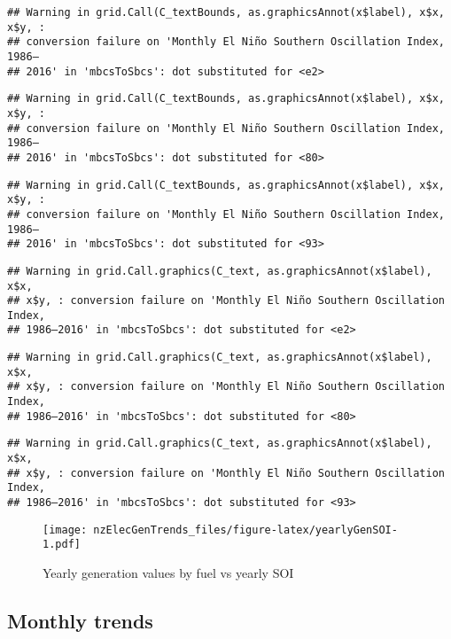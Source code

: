 \documentclass[]{article}
\theoremstyle{definition}
\theoremstyle{definition}
\theoremstyle{definition}
\theoremstyle{remark}
\begin{document}
\begin{verbatim}
## Warning in grid.Call(C_textBounds, as.graphicsAnnot(x$label), x$x, x$y, :
## conversion failure on 'Monthly El Niño Southern Oscillation Index, 1986–
## 2016' in 'mbcsToSbcs': dot substituted for <e2>
\end{verbatim}

\begin{verbatim}
## Warning in grid.Call(C_textBounds, as.graphicsAnnot(x$label), x$x, x$y, :
## conversion failure on 'Monthly El Niño Southern Oscillation Index, 1986–
## 2016' in 'mbcsToSbcs': dot substituted for <80>
\end{verbatim}

\begin{verbatim}
## Warning in grid.Call(C_textBounds, as.graphicsAnnot(x$label), x$x, x$y, :
## conversion failure on 'Monthly El Niño Southern Oscillation Index, 1986–
## 2016' in 'mbcsToSbcs': dot substituted for <93>
\end{verbatim}

\begin{verbatim}
## Warning in grid.Call.graphics(C_text, as.graphicsAnnot(x$label), x$x,
## x$y, : conversion failure on 'Monthly El Niño Southern Oscillation Index,
## 1986–2016' in 'mbcsToSbcs': dot substituted for <e2>
\end{verbatim}

\begin{verbatim}
## Warning in grid.Call.graphics(C_text, as.graphicsAnnot(x$label), x$x,
## x$y, : conversion failure on 'Monthly El Niño Southern Oscillation Index,
## 1986–2016' in 'mbcsToSbcs': dot substituted for <80>
\end{verbatim}

\begin{verbatim}
## Warning in grid.Call.graphics(C_text, as.graphicsAnnot(x$label), x$x,
## x$y, : conversion failure on 'Monthly El Niño Southern Oscillation Index,
## 1986–2016' in 'mbcsToSbcs': dot substituted for <93>
\end{verbatim}

\begin{figure}
\centering
\texttt{[image: nzElecGenTrends\_files/figure-latex/yearlyGenSOI-1.pdf]}
\caption{\label{fig:yearlyGenSOI}Yearly generation values by fuel vs yearly
SOI}
\end{figure}

\subsection{Monthly trends}\label{monthly-trends}
\end{document}
